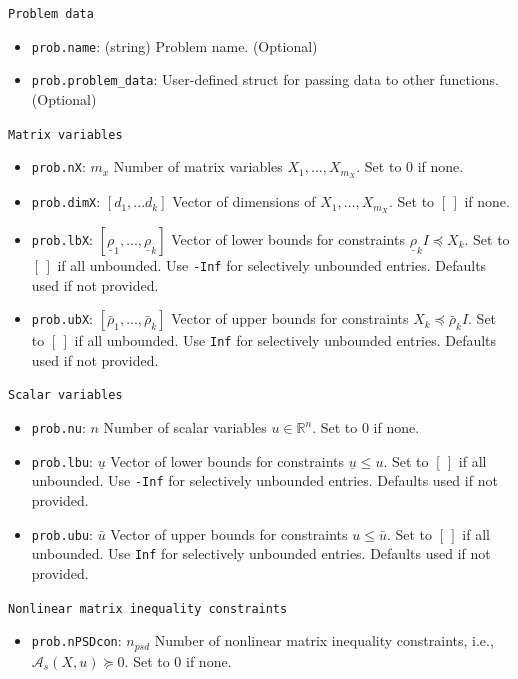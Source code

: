 \documentclass[]{interact}
\theoremstyle{plain}%
\theoremstyle{definition}
\theoremstyle{remark}
\begin{document}
\texttt{Problem data}
\begin{itemize}
    \item \texttt{prob.name}: (string) Problem name. (Optional)
    \item \texttt{prob.problem\_data}: User-defined struct for passing data to other functions. (Optional)
    \end{itemize}
\texttt{Matrix variables}
    \begin{itemize}
    \item \texttt{prob.nX}: $m_x$ Number of matrix variables \(X_1, \ldots, X_{m_X}\). Set to 0 if none.
    \item \texttt{prob.dimX}: \([d_1,...d_k]\) Vector of dimensions of \(X_1, \ldots, X_{m_X}\). Set  to \([\,]\)  if none.
    \item \texttt{prob.lbX}: \([\underline{\rho}_1,...,\underline{\rho}_k]\) Vector of lower bounds for constraints \( \underline{\rho}_k I \preceq X_k\). Set to \([\,]\) if all unbounded. Use \texttt{-Inf} for selectively unbounded entries. Defaults used if not provided.
      \item \texttt{prob.ubX}: \([\bar{\rho}_1,...,\bar{\rho}_k]\) Vector of upper bounds for constraints \( X_k \preceq \bar{\rho}_k I\). Set to \([\,]\) if all unbounded. Use \texttt{Inf} for selectively unbounded entries. Defaults used if not provided.
    \end{itemize}
\texttt{Scalar variables}
    \begin{itemize}
    \item \texttt{prob.nu}: $n$ Number of scalar variables \(u \in \mathbb{R}^n\). Set to 0 if none.
    \item \texttt{prob.lbu}:  \(\underline{u}\) Vector of lower bounds for constraints \( \underline{u} \leq u\). Set to \([\,]\) if all unbounded. Use \texttt{-Inf} for selectively unbounded entries. Defaults used if not provided.
    \item \texttt{prob.ubu}: \(\bar{u}\) Vector of upper bounds for constraints \(u \leq \bar{u}\). Set to \([\,]\) if all unbounded. Use \texttt{Inf} for selectively unbounded entries. Defaults used if not provided.
    \end{itemize}
\texttt{Nonlinear matrix inequality constraints}

    \begin{itemize}
    \item \texttt{prob.nPSDcon}: $n_{psd}$ Number of nonlinear matrix inequality constraints, i.e., \(\mathcal{A}_s(X,u) \succeq 0\). Set to 0 if none.
    \end{itemize}
\end{document}
